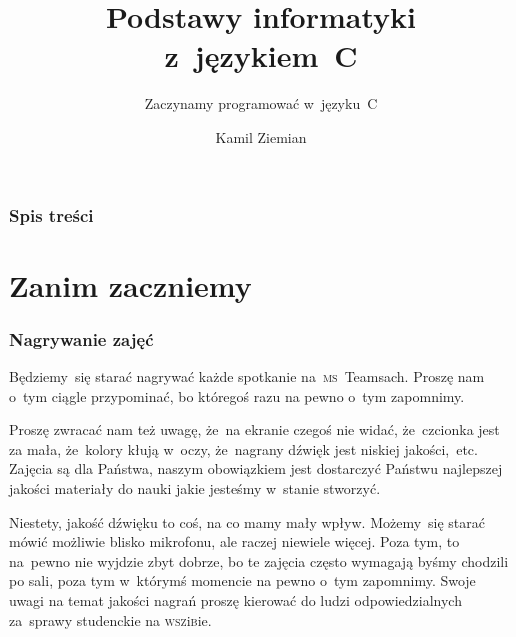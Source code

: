 \documentclass[10pt,t]{beamer}
\title{Podstawy informatyki z~językiem~C}
\subtitle{Zaczynamy programować w~języku~C}
\author{Kamil Ziemian \\
  \email}
\begin{document}





\RaggedRight





\maketitle





\begin{frame}
  \frametitle{Spis treści}


  \tableofcontents

\end{frame}










\section{Zanim zaczniemy}


\begin{frame}
  \frametitle{Nagrywanie zajęć}


  Będziemy~się starać nagrywać każde spotkanie na~\textsc{ms}~Teamsach.
  Proszę nam o~tym ciągle przypominać, bo któregoś razu na pewno o~tym
  zapomnimy.

  Proszę zwracać nam też uwagę, że~na ekranie czegoś nie widać,
  że~czcionka jest za mała, że~kolory kłują w~oczy, że~nagrany dźwięk
  jest niskiej jakości,~etc. Zajęcia są dla Państwa, naszym obowiązkiem jest
  dostarczyć Państwu najlepszej jakości materiały do nauki jakie jesteśmy
  w~stanie stworzyć.

  Niestety, jakość dźwięku to coś, na co mamy mały wpływ. Możemy~się starać
  mówić możliwie blisko mikrofonu, ale raczej niewiele więcej.
  Poza tym, to na~pewno nie wyjdzie zbyt dobrze, bo te zajęcia często
  wymagają byśmy chodzili po sali, poza tym w~którymś momencie na pewno
  o~tym zapomnimy. Swoje uwagi na temat jakości nagrań proszę kierować do
  ludzi odpowiedzialnych za~sprawy studenckie na \textsc{wsz}i\textsc{b}ie.

\end{frame}
\end{document}

